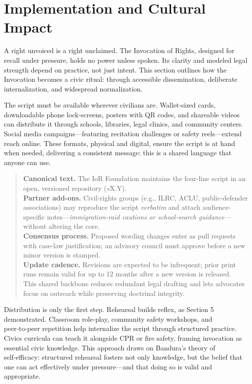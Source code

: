 \section{Implementation and Cultural Impact}\label{sec:implementation-and-cultural-impact}

A right unvoiced is a right unclaimed. The Invocation of Rights, designed for recall under pressure, holds no power unless spoken. Its clarity and modeled legal strength depend on practice, not just intent. This section outlines how the Invocation becomes a civic ritual: through accessible dissemination, deliberate internalization, and widespread normalization.

The script must be available wherever civilians are. Wallet‑sized cards, downloadable phone lock‑screens, posters with QR codes, and shareable videos can distribute it through schools, libraries, legal clinics, and community centers. Social media campaigns—featuring recitation challenges or safety reels—extend reach online. These formats, physical and digital, ensure the script is at hand when needed, delivering a consistent message: this is a shared language that anyone can use.

\begin{quote}\small
\textbf{Canonical text.} The IoR Foundation maintains the four-line script in an open, versioned repository (\textit{v}X.Y).\\
\textbf{Partner add-ons.} Civil-rights groups (e.g., ILRC, ACLU, public-defender associations) may reproduce the script \emph{verbatim} and attach audience-specific notes—\emph{immigration-raid cautions or school-search guidance}—without altering the core.\\
\textbf{Consensus process.} Proposed wording changes enter as pull requests with case-law justification; an advisory council must approve before a new minor version is stamped.\\
\textbf{Update cadence.} Revisions are expected to be infrequent; prior print runs remain valid for up to 12 months after a new version is released.\\
This shared backbone reduces redundant legal drafting and lets advocates focus on outreach while preserving doctrinal integrity.
\end{quote}

Distribution is only the first step. Rehearsal builds reflex, as Section 5 demonstrated. Classroom role‑play, community safety workshops, and peer‑to‑peer repetition help internalize the script through structured practice. Civics curricula can teach it alongside CPR or fire safety, framing invocation as essential civic knowledge. This approach draws on Bandura’s theory of self‑efficacy: structured rehearsal fosters not only knowledge, but the belief that one can act effectively under pressure—and that doing so is valid and appropriate.

